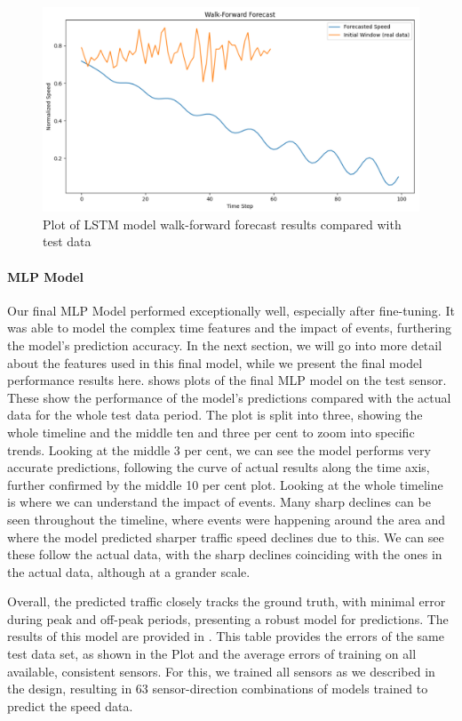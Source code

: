 \begin{figure}[!ht]
  \centering
  \includegraphics[width=\textwidth]{images/results-discussions/walk-forward.pdf}
  \caption{Plot of LSTM model walk-forward forecast results compared with test data}
  \label{fig:lstm-walk}
\end{figure}

\paragraph{MLP Model}
Our final MLP Model performed exceptionally well, especially after fine-tuning. It was able to model the complex time features and the impact of events, furthering the model's prediction accuracy. In the next section, we will go into more detail about the features used in this final model, while we present the final model performance results here.  shows plots of the final MLP model on the test sensor. These show the performance of the model’s predictions compared with the actual data for the whole test data period. The plot is split into three, showing the whole timeline and the middle ten and three per cent to zoom into specific trends. Looking at the middle 3 per cent, we can see the model performs very accurate predictions, following the curve of actual results along the time axis, further confirmed by the middle 10 per cent plot. Looking at the whole timeline is where we can understand the impact of events. Many sharp declines can be seen throughout the timeline, where events were happening around the area and where the model predicted sharper traffic speed declines due to this. We can see these follow the actual data, with the sharp declines coinciding with the ones in the actual data, although at a grander scale. 

Overall, the predicted traffic closely tracks the ground truth, with minimal error during peak and off-peak periods, presenting a robust model for predictions. The results of this model are provided in . This table provides the errors of the same test data set, as shown in the Plot and the average errors of training on all available, consistent sensors. For this, we trained all sensors as we described in the design, resulting in 63 sensor-direction combinations of models trained to predict the speed data. 


